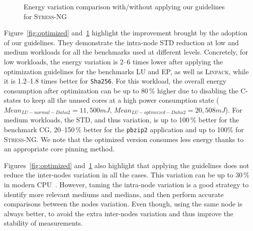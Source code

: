 \begin{figure}%
    \caption{Energy variation comparison with/without applying our guidelines for \textsc{Stress-NG}}\label{fig:stress}
\end{figure}

Figure~\ref{fig:optimized} and~\ref{fig:stress} highlight the improvement brought by the adoption of our guidelines.
They demonstrate the intra-node STD reduction at low and medium workloads for all the benchmarks used at different levels.
Concretely, for low workloads, the energy variation is 2--6 times lower after applying the optimization guidelines for the benchmarks \textsf{LU} and \textsf{EP}, as well as \textsc{Linpack}, while it is 1.2--1.8 times better for \texttt{Sha256}.
For this workload, the overall energy consumption after optimization can be up to 80\,\% higher due to disabling the C-states to keep all the unused cores at a high power consumption state ($Mean_{LU-normal-Dahu2}=11,500 mJ$, $Mean_{LU-optimized-Dahu2}=20,508 mJ$).
For medium workloads, the STD, and thus variation, is up to 100\,\% better for the benchmark \textsf{CG}, 20--150\,\% better for the \texttt{pbzip2} application and up to 100\% for \textsc{Stress-NG}.
We note that the optimized version consumes less energy thanks to an appropriate core pinning method.

Figures~\ref{fig:optimized} and~\ref{fig:stress} also highlight that applying the guidelines does not reduce the inter-nodes variation in all the cases.
This variation can be up to 30\,\% in modern CPU~\cite{wang_experimental_nodate}.
However, taming the intra-node variation is a good strategy to identify more relevant mediums and medians, and then perform accurate comparisons between the nodes variation.
Even though, using the same node is always better, to avoid the extra inter-nodes variation and thus improve the stability of measurements.


